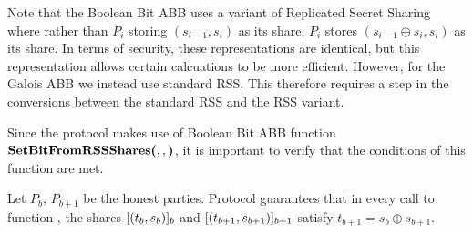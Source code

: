 Note that the Boolean Bit ABB uses a variant of Replicated Secret Sharing
where rather than $P_i$ storing $(s_{i-1}, s_i)$ as its share,
$P_i$ stores $(s_{i-1} \oplus s_i, s_i)$ as its share.
In terms of security, these representations are identical,
but this representation allows certain calcuations to be more efficient.
However, for the Galois ABB we instead use standard RSS.
This therefore requires a step in the conversions between the 
standard RSS and the RSS variant.

Since the protocol makes use of Boolean Bit ABB function
$\textbf{SetBitFromRSSShares(}, , \textbf{)}$, it is important to verify
that the conditions of this function are met.

\begin{theorem}
	Let $P_b$, $P_{b+1}$ be the honest parties.
	Protocol \GalToBoolArr{} guarantees that in every call to
	function \SetBitFromShares{}{}{},
	the shares $[(t_b, s_b)]_{b}$ and 
	$[(t_{b+1}, s_{b+1})]_{b+1}$
	satisfy $t_{b+1} = s_b \oplus s_{b+1}$.
\end{theorem}
